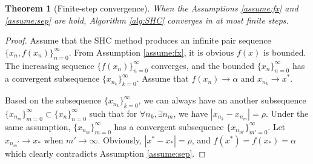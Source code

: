 \documentclass[preprint,12pt]{elsarticle}
\newtheorem{theorem}{Theorem}
\begin{document}
\begin{theorem}[Finite-step convergence]
	When the Assumptions \ref{assume:fx} and \ref{assume:sep} are
	hold, Algorithm \ref{alg:SHC} converges in at most finite
	steps.
\end{theorem}
\begin{proof}
	Assume that the SHC method produces an infinite pair sequence
	$\{x_n, f(x_n)\}_{n=0}^{\infty}$. From Assumption \ref{assume:fx},
	it is obvious $f(x)$ is bounded. The increasing sequence
	$\{f(x_n)\}_{n=0}^\infty$ converges, and the bounded
	$\{x_n\}_{n=0}^\infty$ has a convergent subsequence 
	$\{x_{n_k}\}_{k=0}^\infty$. Assume that $f(x_n)\rightarrow
	\alpha$ and $x_{n_k}\rightarrow x^*$. 
	
	Based on the subsequence $\{x_{n_k}\}_{k=0}^\infty$, we can
	always have an another subsequence
	$\{x_{n_m}\}_{m=0}^\infty\subset \{x_n\}_{n=0}^{\infty}$ such that 
	for $\forall n_k, \exists n_m$, we have  
	$|x_{n_k}-x_{n_{m}}|=\rho$. Under the same assumption,
	$\{x_{n_m}\}_{m=0}^\infty$ has a convergent subsequence
	$\{x_{n_{m'}}\}_{m'=0}^\infty$. Let $x_{n_m'} \rightarrow
	x_*$ when $m'\rightarrow \infty$. 
	Obviously, $|x^*-x_*|=\rho$, and $f(x^*)=f(x_*)=\alpha$ 
	which clearly contradicts Assumption \ref{assume:sep}.
\end{proof}
\end{document}
